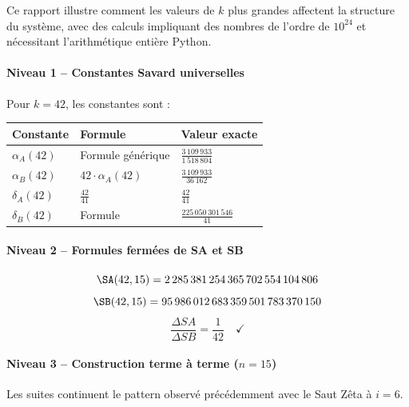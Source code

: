 Ce rapport illustre comment les valeurs de $k$ plus grandes affectent la structure du système, avec des calculs impliquant des nombres de l'ordre de $10^{24}$ et nécessitant l'arithmétique entière Python.

\vspace{0.3cm}

\paragraph{Niveau 1 -- Constantes Savard universelles}

Pour $k=42$, les constantes sont :
\begin{center}
\small
\begin{tabular}{@{}lll@{}}
\toprule
\rowcolor{spectralgris}
\textbf{Constante} & \textbf{Formule} & \textbf{Valeur exacte} \\
\midrule
$\alpha_A(42)$ & Formule générique & $\frac{3\,109\,933}{1\,518\,804}$ \\
$\alpha_B(42)$ & $42 \cdot \alpha_A(42)$ & $\frac{3\,109\,933}{36\,162}$ \\
$\delta_A(42)$ & $\frac{42}{41}$ & $\frac{42}{41}$ \\
$\delta_B(42)$ & Formule & $\frac{225\,050\,301\,546}{41}$ \\
\bottomrule
\end{tabular}
\end{center}

\vspace{0.3cm}

\paragraph{Niveau 2 -- Formules fermées de SA et SB}

$$\SA(42, 15) = 2\,285\,381\,254\,365\,702\,554\,104\,806$$
$$\SB(42, 15) = 95\,986\,012\,683\,359\,501\,783\,370\,150$$
$$\frac{\Delta SA}{\Delta SB} = \frac{1}{42} \quad \checkmark$$

\vspace{0.3cm}

\paragraph{Niveau 3 -- Construction terme à terme ($n = 15$)}

Les suites continuent le pattern observé précédemment avec le Saut Zêta à $i=6$.


